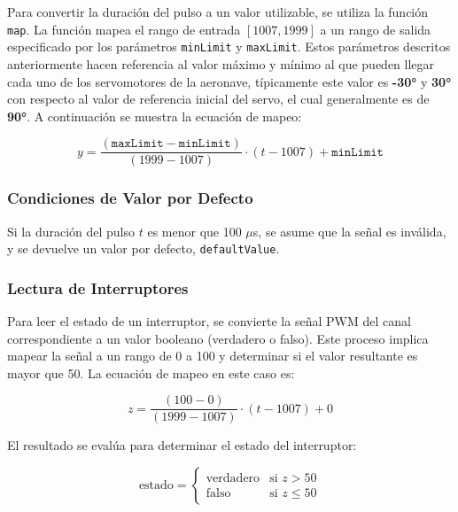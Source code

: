                 Para convertir la duración del pulso a un valor utilizable, se utiliza la función \texttt{map}. La función mapea el rango de entrada \([1007, 1999]\) a un rango de salida especificado por los parámetros \texttt{minLimit} y \texttt{maxLimit}. Estos parámetros descritos anteriormente hacen referencia al valor máximo y mínimo al que pueden llegar cada uno de los servomotores de la aeronave, típicamente este valor es \textbf{-30°} y \textbf{30°} con respecto al valor de referencia inicial del servo, el cual generalmente es de \textbf{90°}. A continuación se muestra la ecuación de mapeo:


                \begin{equation*}
                y = \frac{(\texttt{maxLimit} - \texttt{minLimit})}{(1999 - 1007)} \cdot (t - 1007) + \texttt{minLimit}
                \end{equation*}
        
            \subsubsection{Condiciones de Valor por Defecto}\vspace{5px}
    
                Si la duración del pulso \( t \) es menor que 100 $\mu$s, se asume que la señal es inválida, y se devuelve un valor por defecto, \texttt{defaultValue}.
    
            \subsubsection{Lectura de Interruptores}\vspace{5px}
    
                Para leer el estado de un interruptor, se convierte la señal PWM del canal correspondiente a un valor booleano (verdadero o falso). Este proceso implica mapear la señal a un rango de 0 a 100 y determinar si el valor resultante es mayor que 50. La ecuación de mapeo en este caso es:

                \begin{equation}
                z = \frac{(100 - 0)}{(1999 - 1007)} \cdot (t - 1007) + 0
                \end{equation}

                El resultado se evalúa para determinar el estado del interruptor:

                \begin{equation}
                \text{estado} = 
                \begin{cases} 
                \text{verdadero} & \text{si } z > 50 \\
                \text{falso} & \text{si } z \leq 50 
                \end{cases}
                \end{equation}

